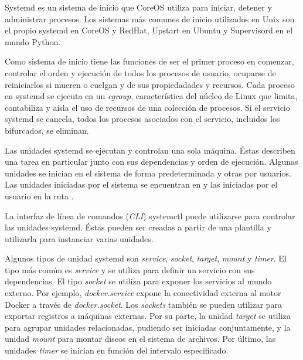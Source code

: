 Systemd es un sistema de inicio que CoreOS utiliza para iniciar, detener y administrar procesos. Los sistemas más comunes de inicio utilizados en Unix son el propio systemd en CoreOS y RedHat, Upstart en Ubuntu y Supervisord en el mundo Python.

Como sistema de inicio tiene las funciones de ser el primer proceso en comenzar, controlar el orden y ejecución de todos los procesos de usuario, ocuparse de reiniciarlos si mueren o cuelgan y de sus propiedadades y recursos. Cada proceso en systemd se ejecuta en un \textit{cgroup}, característica del núcleo de Linux que limita, contabiliza y aísla el uso de recursos de una colección de procesos. Si el servicio systemd se cancela, todos los procesos asociados con el servicio, incluidos los bifurcados, se eliminan. 

Las unidades systemd se ejecutan y controlan una sola máquina. Éstas describen una tarea en particular junto con sus dependencias y orden de ejecución. Algunas unidades se inician en el sistema de forma predeterminada y otras por usuarios. Las unidades iniciadas por el sistema se encuentran en  y las iniciadas por el usuario en la ruta .

La interfaz de línea de comandos (\textit{CLI}) systemctl puede utilizarse para controlar las unidades systemd. Éstas pueden ser creadas a partir de una plantilla y utilizarla para instanciar varias unidades.


Algunos tipos de unidad systemd son \textit{service}, \textit{socket}, \textit{target}, \textit{mount} y \textit{timer}. El tipo más común es \textit{service} y se utiliza para definir un servicio con sus dependencias. El tipo \textit{socket} se utiliza para exponer los servicios al mundo externo. Por ejemplo, \textit{docker.service} expone la conectividad externa al motor Docker a través de \textit{docker.socket}. Los \textit{sockets} también se pueden utilizar para exportar registros a máquinas externas. Por su parte, la unidad \textit{target} se utiliza para agrupar unidades relacionadas, pudiendo ser iniciadas conjuntamente, y la unidad \textit{mount} para montar discos en el sistema de archivos. Por último, las unidades \textit{timer} se inician en función del intervalo especificado.

